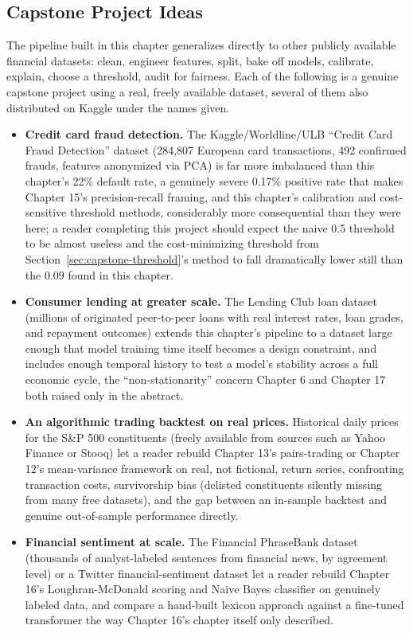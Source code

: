 \documentclass[../ai_in_finance]{subfiles}
\begin{document}
\subsection{Capstone Project Ideas}
\label{sec:capstone-projects}

The pipeline built in this chapter generalizes directly to other publicly available financial datasets: clean, engineer features, split, bake off models, calibrate, explain, choose a threshold, audit for fairness. Each of the following is a genuine capstone project using a real, freely available dataset, several of them also distributed on Kaggle under the names given.

\begin{itemize}
    \item \textbf{Credit card fraud detection.} The Kaggle/Worldline/ULB ``Credit Card Fraud Detection'' dataset (284,807 European card transactions, 492 confirmed frauds, features anonymized via PCA) is far more imbalanced than this chapter's 22\% default rate, a genuinely severe 0.17\% positive rate that makes Chapter 15's precision-recall framing, and this chapter's calibration and cost-sensitive threshold methods, considerably more consequential than they were here; a reader completing this project should expect the naive 0.5 threshold to be almost useless and the cost-minimizing threshold from Section~\ref{sec:capstone-threshold}'s method to fall dramatically lower still than the $0.09$ found in this chapter.
    \item \textbf{Consumer lending at greater scale.} The Lending Club loan dataset (millions of originated peer-to-peer loans with real interest rates, loan grades, and repayment outcomes) extends this chapter's pipeline to a dataset large enough that model training time itself becomes a design constraint, and includes enough temporal history to test a model's stability across a full economic cycle, the ``non-stationarity'' concern Chapter 6 and Chapter 17 both raised only in the abstract.
    \item \textbf{An algorithmic trading backtest on real prices.} Historical daily prices for the S\&P 500 constituents (freely available from sources such as Yahoo Finance or Stooq) let a reader rebuild Chapter 13's pairs-trading or Chapter 12's mean-variance framework on real, not fictional, return series, confronting transaction costs, survivorship bias (delisted constituents silently missing from many free datasets), and the gap between an in-sample backtest and genuine out-of-sample performance directly.
    \item \textbf{Financial sentiment at scale.} The Financial PhraseBank dataset (thousands of analyst-labeled sentences from financial news, by agreement level) or a Twitter financial-sentiment dataset let a reader rebuild Chapter 16's Loughran-McDonald scoring and Naive Bayes classifier on genuinely labeled data, and compare a hand-built lexicon approach against a fine-tuned transformer the way Chapter 16's chapter itself only described.

\end{itemize}
\end{document}
